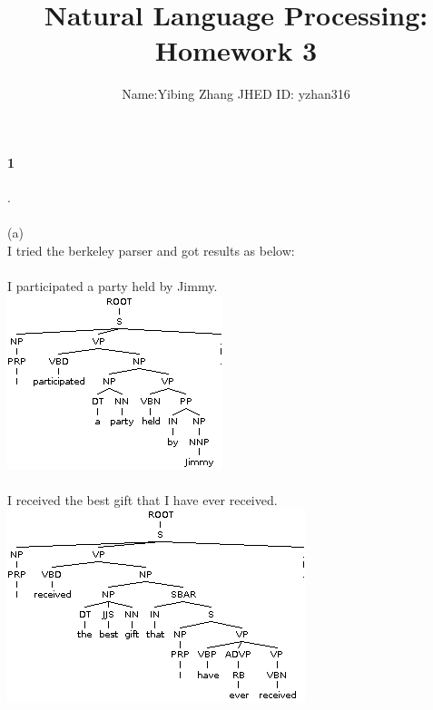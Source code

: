 \documentclass[11pt]{article}
\title{Natural Language Processing: Homework 3}
\author{Name:Yibing Zhang   JHED ID: yzhan316 }
\begin{document}
\large
	\maketitle
	\thispagestyle{headings}
	
	\vspace{-.5in}


	
	\paragraph{1}.\\
\\
(a)\\
I tried the berkeley parser and got results as below:\\
\\
I participated a party held by Jimmy.\\
\includegraphics[width=0.8\linewidth]{parse1.png}\\
\\
I received the best gift that I have ever received.\\
\includegraphics[width=0.8\linewidth]{parse2.png}\\
\end{document}
